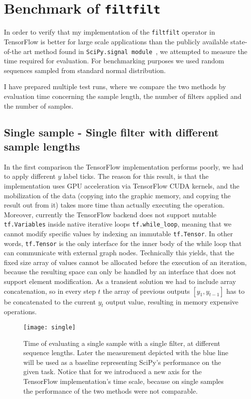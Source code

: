 \chapter{Benchmark of \texttt{filtfilt}}

In order to verify that my implementation of the \texttt{filtfilt} operator in TensorFlow is better for large scale applications than the publicly available state-of-the art method found in \texttt{SciPy.signal module}~\cite{scipy}, we attempted to measure the time required for evaluation.
For benchmarking purposes we used random sequences sampled from standard normal distribution.

I have prepared multiple test runs, where we compare the two methods by evaluation time concerning the sample length, the number of filters applied and the number of samples.

\section{Single sample - Single filter with different sample lengths}
In the first comparison the TensorFlow implementation performs poorly, we had to apply different $y$ label ticks.
The reason for this result, is that the implementation uses GPU acceleration via TensorFlow CUDA kernels, and the mobilization of the data (copying into the graphic memory, and copying the result out from it) takes more time than actually executing the operation.
Moreover, currently the TensorFlow backend does not support mutable \texttt{tf.Variables} inside native iterative loops \texttt{tf.while\_loop}, meaning that we cannot modify specific values by indexing an immutable \texttt{tf.Tensor}.
 In other words, \texttt{tf.Tensor} is the only interface for the inner body of the while loop that can communicate with external graph nodes.
Technically this yields, that the fixed size array of values cannot be allocated before the execution of an iteration, because the resulting space can only be handled by an interface that does not support element modification.
As a transient solution we had to include array concatenation, so in every step $t$ the array of previous outputs $[y_{1}, y_{t-1}]$ has to be concatenated to the current $y_t$ output value, resulting in memory expensive operations.

\begin{figure}[h]
  \texttt{[image: single]}
  \caption{Time of evaluating a single sample with a single filter, at different sequence lengths. Later the measurement depicted with the blue line will be used as a baseline representing SciPy's performance on the given task. Notice that for we introduced a new axis for the TensorFlow implementation's time scale, because on single samples the performance of the two methods were not comparable.}
\end{figure}

